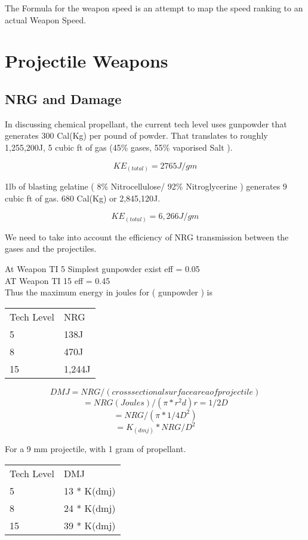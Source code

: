 The Formula for the weapon speed is an attempt to map the speed 
ranking to an actual Weapon Speed. 

\section{Projectile Weapons}
\subsection{NRG and Damage}

In discussing chemical propellant, the current tech level uses 
gunpowder that generates 300 Cal(Kg) per pound of powder. That 
translates to roughly 1,255,200J, 5 cubic ft of gas (45\% gases, 55\% 
vaporised Salt ).

\[KE_{(total)} = 2765 J/gm \]

1lb of blasting gelatine ( 8\% Nitrocellulose/ 92\% Nitroglycerine )
generates 9 cubic ft of gas. 680 Cal(Kg) or 2,845,120J. 

\[KE_{(total)} = 6,266J/gm\]

We need to take into account the efficiency of NRG transmission 
between the gases and the projectiles. 

At Weapon TI 5 Simplest gunpowder exist	eff = 0.05 \\

AT Weapon TI 15 eff = 0.45 \\

Thus the maximum energy in joules for ( gunpowder ) is  

\begin{tabular}{ll} \hline
Tech Level  & NRG \\
	5 	    & 138J \\
	8	    & 470J \\
	15  	& 1,244J  \\ \hline 
\end{tabular}
                 
\[DMJ 	= NRG/(cross sectional surface area of projectile)\]
\[= NRG(Joules)/(\pi * r^{2}d)  r = 1/2 D \]
\[= NRG/(\pi * 1/4 D^{2}) \]
\[= K_{(dmj)} * NRG/D^{2} \]

For a 9 mm projectile, with 1 gram of propellant.

\begin{tabular}{ll} \hline 
Tech Level  & DMJ \\
	5		& 13 * K(dmj) \\
	8		& 24 * K(dmj) \\
	15		& 39 * K(dmj) \\ \hline 
\end{tabular}

